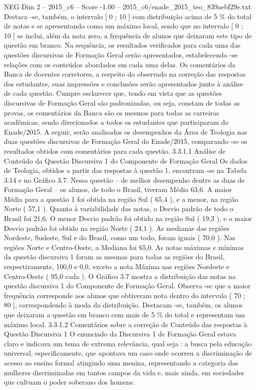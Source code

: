\begin{textsample}{NEG Dim 2 – 2015\_c6 – Score -1.00 – 2015\_c6/enade\_2015\_teo\_839aebf29e.txt}
Destaca -se, também, o intervalo [ 0 ; 10 ] com distribuição acima de 5 \% do total de notas e se apresentando como um máximo local, sendo que no intervalo [ 0 ; 10 ] se inclui, além da nota zero, a frequência de alunos que deixaram este tipo de questão em branco.
Na sequência, os resultados verificados para cada uma das questões discursivas de Formação Geral serão apresentados, estabelecendo -se relações com os conteúdos abordados em cada uma delas.
Os comentários da Banca de docentes corretores, a respeito do observado na correção das respostas dos estudantes, suas impressões e conclusões serão apresentados junto à análise de cada questão.
Cumpre esclarecer que, tendo em vista que as questões discursivas de Formação Geral são padronizadas, ou seja, constam de todas as provas, os comentários da Banca são os mesmos para todas as carreiras acadêmicas, sendo direcionados a todos os estudantes que participaram do Enade/2015.
A seguir, serão analisados os desempenhos da Área de Teologia nas duas questões discursivas de Formação Geral do Enade/2015, comparando -se os resultados obtidos com comentários para cada questão. 3.3.1.1 Análise de Conteúdo da Questão Discursiva 1 do Componente de Formação Geral Os dados de Teologia, obtidos a partir das respostas à questão 1, encontram -se na Tabela 3.14 e no Gráfico 3.7.
Nessa questão – de melhor desempenho dentre as duas de Formação Geral – os alunos, de todo o Brasil, tiveram Média 63,6.
A maior Média para a questão 1 foi obtida na região Sul ( 65,4 ), e a menor, na região Norte ( 57,1 ).
Quanto à variabilidade das notas, o Desvio padrão de todo o Brasil foi 21,6.
O menor Desvio padrão foi obtido na região Sul ( 19,3 ), e o maior Desvio padrão foi obtido na região Norte ( 24,1 ).
As medianas das regiões Nordeste, Sudeste, Sul e do Brasil, como um todo, foram iguais ( 70,0 ).
Nas regiões Norte e Centro-Oeste, a Mediana foi 65,0.
As notas máximas e mínimas da questão discursiva 1 foram as mesmas para todas as regiões do Brasil, respectivamente, 100,0 e 0,0, exceto a nota Máxima nas regiões Nordeste e Centro-Oeste ( 95,0 cada ).
O Gráfico 3.7 mostra a distribuição das notas na questão discursiva 1 do Componente de Formação Geral.
Observa -se que a maior frequência corresponde aos alunos que obtiveram nota dentro do intervalo ( 70 ; 80 ], correspondendo à moda da distribuição.
Destacam -se, também, os alunos que deixaram a questão em branco com mais de 5 \% do total e representam um máximo local. 3.3.1.2 Comentários sobre a correção de Conteúdo das respostas à Questão Discursiva 1 O enunciado da Discursiva 1 de Formação Geral estava claro e indicava um tema de extrema relevância, qual seja : a busca pela educação universal, especificamente, que apontava um caso onde ocorreu a discriminação de acesso ao ensino formal atingindo uma menina, representando a categoria das mulheres discriminadas em tantos campos da vida e, mais ainda, em sociedades que cultuam o poder soberano dos homens.

\end{textsample}
